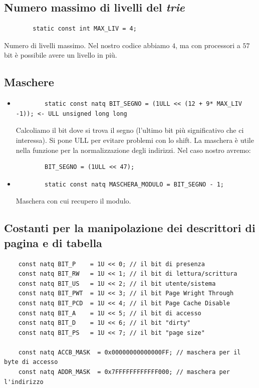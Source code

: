 \documentclass[11pt]{report}
\theoremstyle{definition}
\begin{document}
\subsection{Numero massimo di livelli del \emph{trie}} \begin{verbatim}
		static const int MAX_LIV = 4;
	\end{verbatim}
	Numero di livelli massimo. Nel nostro codice abbiamo $4$, ma con processori a $57$ bit è possibile avere un livello in più. 
\subsection{Maschere}
\begin{itemize}
	\item 
	\begin{verbatim}
		static const natq BIT_SEGNO = (1ULL << (12 + 9* MAX_LIV -1)); <- ULL unsigned long long
	\end{verbatim}
	Calcoliamo il bit dove si trova il segno (l'ultimo bit più significativo che ci interessa). Si pone ULL per evitare problemi con lo shift. La maschera è utile nella funzione per la normalizzazione degli indirizzi. Nel caso nostro avremo:
	\begin{verbatim}
		BIT_SEGNO = (1ULL << 47);
	\end{verbatim}
	\item \begin{verbatim} 
		static const natq MASCHERA_MODULO = BIT_SEGNO - 1;
	\end{verbatim} 
	Maschera con cui recupero il modulo.
\end{itemize}	
\subsection{Costanti per la manipolazione dei descrittori di pagina e di tabella}
\small
\begin{verbatim}
	const natq BIT_P    = 1U << 0; // il bit di presenza
	const natq BIT_RW   = 1U << 1; // il bit di lettura/scrittura
	const natq BIT_US   = 1U << 2; // il bit utente/sistema
	const natq BIT_PWT  = 1U << 3; // il bit Page Wright Through
	const natq BIT_PCD  = 1U << 4; // il bit Page Cache Disable
	const natq BIT_A    = 1U << 5; // il bit di accesso
	const natq BIT_D    = 1U << 6; // il bit "dirty"
	const natq BIT_PS   = 1U << 7; // il bit "page size"
	
	const natq ACCB_MASK  = 0x00000000000000FF; // maschera per il byte di accesso
	const natq ADDR_MASK  = 0x7FFFFFFFFFFFF000; // maschera per l'indirizzo
\end{verbatim}
\normalsize
\end{document}
